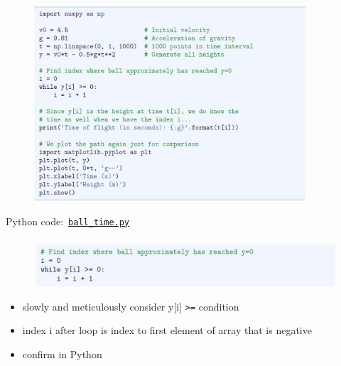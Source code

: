\documentclass[english,14pt]{beamer}
\begin{document}
\begin{frame}[fragile]

\frametitle{}

\begin{figure}[ht]
	\centering
	\includegraphics[width=0.9\textwidth]{figures/LLp65a}
\end{figure}
\vspace*{-3mm}
Python code:~\href{https://github.com/slgit/prog4comp_2/blob/master/py36-src/ball_time.py}{\texttt{ball\_time.py}}

\end{frame}


\begin{frame}[fragile]

\frametitle{}

\begin{figure}[ht]
	\centering
	\includegraphics[width=\textwidth]{figures/LLp65b}
\end{figure}

\begin{itemize}
	\item slowly and meticulously consider y[i] \verb+>=+  condition
	\item index i after loop is index to first element of array that is negative
	\item confirm in Python
\end{itemize}

\end{frame}
\end{document}
